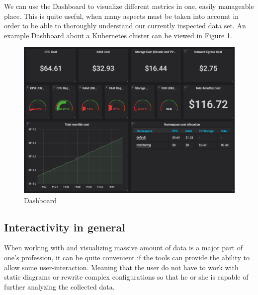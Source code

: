 We can use the Dashboard to visualize different metrics in one, easily manageable place. This is quite useful, when many aspects must be taken into account in order to be able to thoroughly understand our currently inspected data set. An example Dashboard about a Kubernetes cluster can be viewed in Figure \ref{fig:dashboard}.


\begin{figure}[H]
	\centering
	\includegraphics[width=130mm, keepaspectratio]{figures/dashboard-small.png}
	\caption{Dashboard \cite{grafana-dashboard-img}}
	\label{fig:dashboard}
\end{figure}

\subsection{Interactivity in general} \label{interactivity-general}
When working with and visualizing massive amount of data is a major part of one's profession, it can be quite convenient if the tools can provide the ability to allow some user-interaction. Meaning that the user do not have to work with static diagrams or rewrite complex configurations so that he or she is capable of further analyzing the collected data.


